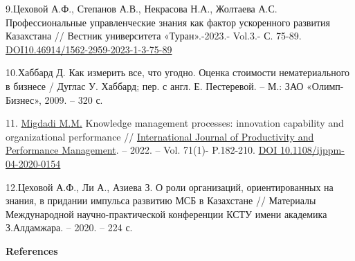 \begin{references}
9.Цеховой А.Ф., Степанов А.В., Некрасова Н.А., Жолтаева А.С.
Профессиональные управленческие знания как фактор ускоренного развития
Казахстана // Вестник университета «Туран».-2023.- Vol.3.- С. 75-89.
\href{https://doi.org/10.46914/1562-2959-2023-1-3-75-89}{DOI10.46914/1562-2959-2023-1-3-75-89}

10.Хаббард Д. Как измерить все, что угодно. Оценка стоимости
нематериального в бизнесе / Дуглас У. Хаббард; пер. с англ. Е.
Пестеревой. -- М.: ЗАО «Олимп-Бизнес», 2009. -- 320 с.

11. \href{https://www.emerald.com/insight/search?q=Mahmoud\%20Mohammad\%20Migdadi}{Migdadi
M.M.} Knowledge management processes: innovation capability and
organizational performance //
\href{https://www.emerald.com/insight/publication/issn/1741-0401}{International
Journal of Productivity and Performance Management}. -- 2022. -- Vol.
71(1)- P.182-210. \href{https://doi.org/10.1108/ijppm-04-2020-0154}{DOI
10.1108/ijppm-04-2020-0154}

12.Цеховой А.Ф., Ли А., Азиева З. О роли организаций, ориентированных на
знания, в придании импульса развитию МСБ в Казахстане // Материалы
Международной научно-практической конференции КСТУ имени академика
З.Алдамжара. -- 2020. -- 224 с.
\end{references}

\begin{center}
{\bfseries References}
\end{center}

